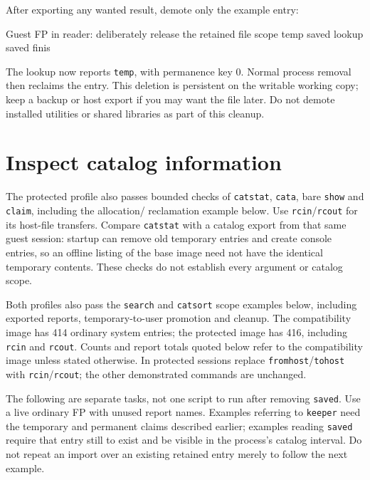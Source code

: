 After exporting any wanted result, demote only the example entry:

\begin{commandexample}{Guest FP in reader: deliberately release the retained file}
scope temp saved
lookup saved
finis
\end{commandexample}

The lookup now reports \passthrough{\lstinline!temp!}, with permanence key 0. Normal process removal then reclaims the entry. This deletion is persistent on the writable working copy; keep a backup or host export if you may want the file later. Do not demote installed utilities or shared libraries as part of this cleanup.

\section{Inspect catalog information}\label{inspect-catalog-information}

The protected profile also passes bounded checks of \texttt{catstat},
\texttt{cata}, bare \texttt{show} and \texttt{claim}, including the allocation/
reclamation example below. Use \texttt{rcin}/\texttt{rcout} for its host-file
transfers. Compare \texttt{catstat} with a catalog export from that same guest
session: startup can remove old temporary entries and create console entries,
so an offline listing of the base image need not have the identical temporary
contents. These checks do not establish every argument or catalog scope.

Both profiles also pass the \texttt{search} and \texttt{catsort} scope examples
below, including exported reports, temporary-to-user promotion and cleanup.
The compatibility image has 414 ordinary system entries; the protected image
has 416, including \texttt{rcin} and \texttt{rcout}. Counts and report totals
quoted below refer to the compatibility image unless stated otherwise. In
protected sessions replace \texttt{fromhost}/\texttt{tohost} with
\texttt{rcin}/\texttt{rcout}; the other demonstrated commands are unchanged.

The following are separate tasks, not one script to run after removing
\passthrough{\lstinline!saved!}. Use a live ordinary FP with unused report
names. Examples referring to \passthrough{\lstinline!keeper!} need the
temporary and permanent claims described earlier; examples reading
\passthrough{\lstinline!saved!} require that entry still to exist and be
visible in the process's catalog interval. Do not repeat an import over an
existing retained entry merely to follow the next example.

